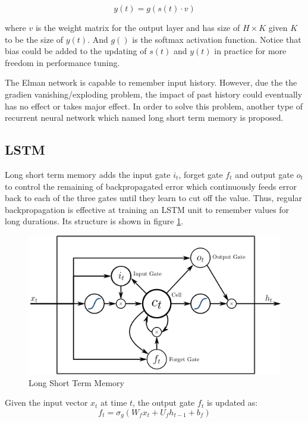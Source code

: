 \documentclass[]{article}
\begin{document}
\begin{equation}
	y(t) = g(s(t) \cdot v)
\end{equation}

where $v$ is the weight matrix for the output layer and has size of $H \times K$ given $K$ to be the size of $y(t)$. 
And $g()$ is the softmax activation function.
Notice that bias could be added to the updating of $s(t)$ and $y(t)$ in practice for more freedom in performance tuning.


The Elman network is capable to remember input history. 
However, due the the gradien vanishing/exploding problem, the impact of past history could eventually has no effect or takes major effect\cite{hochreiter1998vanishing}.
In order to solve this problem, another type of recurrent neural network which named long short term memory is proposed\cite{hochreiter1997long}.



\subsection{LSTM}
Long short term memory adds the input gate $i_t$, forget gate $f_t$ and output gate $o_t$ to control the remaining of backpropagated error which continuously feeds error back to each of the three gates until they learn to cut off the value. 
Thus, regular backpropagation is effective at training an LSTM unit to remember values for long durations.
Its structure is shown in figure \ref{lstm}.

\begin{figure}
	\includegraphics[scale=0.65]{lstm.png}
	\caption{Long Short Term Memory\cite{hochreiter1997long}}
	\label{lstm}
\end{figure}
Given the input vector $x_t$ at time $t$, the output gate $f_t$ is updated as:
\begin{equation}
	f_t = \sigma_g(W_fx_t + U_fh_{t-1} + b_f)
\end{equation}
\end{document}
